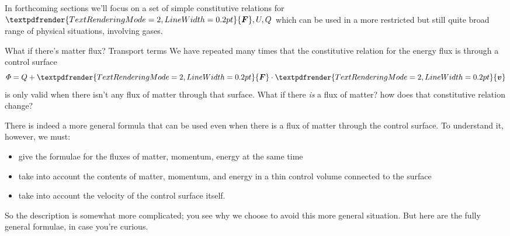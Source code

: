 \documentclass[a4paper,12pt,%
onecolumn,oneside,%
british%
]{memoir}
\renewcommand*{\bm}[1]{\textpdfrender{TextRenderingMode=2,LineWidth=0.2pt}{\boldsymbol{#1}}}
\renewcommand*{\|}[1][]{\nonscript\:#1\vert\nonscript\:\mathopen{}}
\newcommand*{\yv}{\bm{v}}
\newcommand*{\yU}{U}
\newcommand*{\yH}{\varPhi}%
\newcommand*{\yQ}{Q}%
\newcommand*{\yF}{\bm{F}}
\begin{document}
In forthcoming sections we'll focus on a set of simple constitutive relations for $\yF,\yU,\yQ$ which can be used in a more restricted but still quite broad range of physical situations, involving gases.

\begin{extra}{What if there's matter flux? Transport terms}\label{ex:energy_matter_flux}
  We have repeated many times that the constitutive relation for the energy flux is through a control surface
  \begin{equation*}
    \yH = \yQ + \yF\cdot\yv
  \end{equation*}
  is only valid when there isn't any flux of matter through that surface. What if there \emph{is} a flux of matter? how does that constitutive relation change?

  There is indeed a more general formula that can be used even when there is a flux of matter through the control surface. To understand it, however, we must:
  \begin{itemize}[nosep]
  \item give the formulae for the fluxes of matter, momentum, energy at the same time
  \item take into account the contents of matter, momentum, and energy in a thin control volume connected to the surface
  \item take into account the velocity of the control surface itself.
  \end{itemize}
So the description is somewhat more complicated; you see why we choose to avoid this more general situation. But here are the fully general formulae, in case you're curious.


\end{extra}
\end{document}
